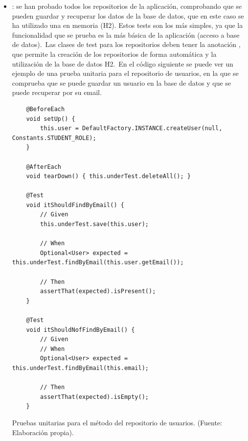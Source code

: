 \begin{itemize}
	\item {}: se han probado todos los repositorios de la aplicación, comprobando que se pueden
	guardar y recuperar los datos de la base de datos, que en este caso se ha utilizado una en memoria (H2).
	Estos tests son los más simples, ya que la funcionalidad
	que se prueba es la más básica de la aplicación (acceso a base de datos).\ Las clases de test para los
	repositorios deben tener la anotación , que permite la creación de los repositorios
	de forma automática y la utilización de la base de datos H2.\ En el código siguiente se puede
	ver un ejemplo de una prueba unitaria para el repositorio de usuarios, en la que se comprueba que se puede
	guardar un usuario en la base de datos y que se puede recuperar por su email.
	\begin{codeBlock}
		\begin{verbatim}
	@BeforeEach
	void setUp() {
		this.user = DefaultFactory.INSTANCE.createUser(null, Constants.STUDENT_ROLE);
	}

	@AfterEach
	void tearDown() { this.underTest.deleteAll(); }

	@Test
	void itShouldFindByEmail() {
		// Given
		this.underTest.save(this.user);

		// When
		Optional<User> expected = this.underTest.findByEmail(this.user.getEmail());

		// Then
		assertThat(expected).isPresent();
	}

	@Test
	void itShouldNofFindByEmail() {
		// Given
		// When
		Optional<User> expected = this.underTest.findByEmail(this.email);

		// Then
		assertThat(expected).isEmpty();
	}
		\end{verbatim}
		\caption{Pruebas unitarias para el método  del repositorio de usuarios.
			(Fuente: Elaboración propia).}
		\label{code:pruebas-unitarias-repositorio-usuarios}
	\end{codeBlock}


\end{itemize}

